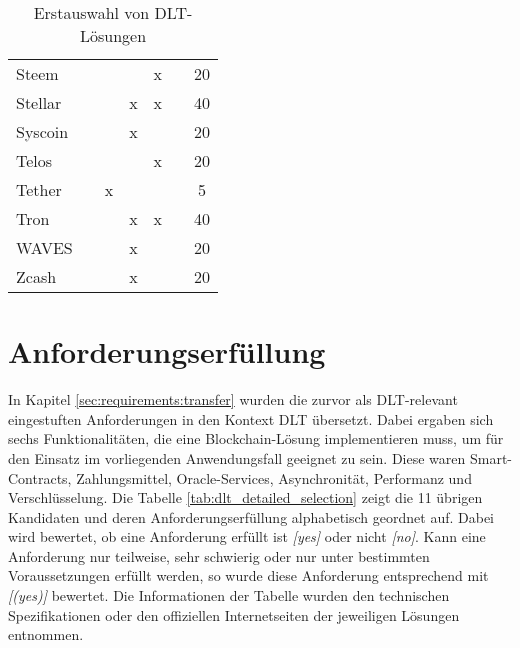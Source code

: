 \begin{table}[]
\begin{tabular}{lcccccc}
Steem &  &  &  & x &  & 20 \\
Stellar &  &  & x & x &  & 40 \\
Syscoin &  &  & x &  &  & 20 \\
Telos &  &  &  & x &  & 20 \\
Tether &  & x &  &  &  & 5 \\
Tron &  &  & x & x &  & 40 \\
WAVES &  &  & x &  &  & 20 \\
Zcash &  &  & x &  &  & 20 \\ \hline
\end{tabular}
\caption{Erstauswahl von DLT-Lösungen}
\label{tab:dlt_preselection}
\end{table}

%
%
\section{Anforderungserfüllung}
\label{sec:dlt_selection:fullfilment}
In Kapitel \ref{sec:requirements:transfer} wurden die zurvor als \ac{DLT}-relevant eingestuften Anforderungen in den Kontext \ac{DLT} übersetzt. Dabei ergaben sich sechs Funktionalitäten, die eine Blockchain-Lösung implementieren muss, um für den Einsatz im vorliegenden Anwendungsfall geeignet zu sein. Diese waren Smart-Contracts, Zahlungsmittel, Oracle-Services, Asynchronität, Performanz und Verschlüsselung. Die Tabelle \ref{tab:dlt_detailed_selection} zeigt die 11 übrigen Kandidaten und deren Anforderungserfüllung alphabetisch geordnet auf. Dabei wird bewertet, ob eine Anforderung erfüllt ist \textit{[yes]} oder nicht \textit{[no]}. Kann eine Anforderung nur teilweise, sehr schwierig oder nur unter bestimmten Voraussetzungen erfüllt werden, so wurde diese Anforderung entsprechend mit \textit{[(yes)]} bewertet. Die Informationen der Tabelle wurden den technischen Spezifikationen oder den offiziellen Internetseiten der jeweiligen Lösungen entnommen.

